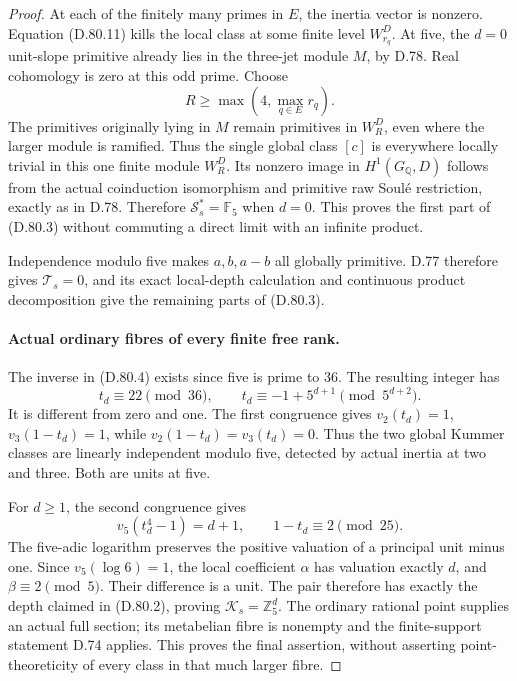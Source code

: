 \begin{proof}
At each of the finitely many primes in \(E\), the inertia
vector is nonzero. Equation (D.80.11) kills the local
class at some finite level \(W_{r_q}^D\). At five,
the \(d=0\) unit-slope primitive already lies in the
three-jet module \(M\), by D.78. Real cohomology is
zero at this odd prime. Choose
\[
                         R\ge\max(4,\max_{q\in E}r_q).
                                                               \tag{D.80.15}
\]
The primitives originally lying in \(M\) remain primitives
in \(W_R^D\), even where the larger module is ramified.
Thus the single global class \([c]\) is everywhere locally
trivial in this one finite module \(W_R^D\). Its nonzero
image in \(H^1(G_{\mathbb Q},D)\) follows from the actual
coinduction isomorphism and primitive raw Soul\'e restriction,
exactly as in D.78. Therefore \(\mathcal S_s^*=\mathbb F_5\)
when \(d=0\). This proves the first part of (D.80.3)
without commuting a direct limit with an infinite product.

Independence modulo five makes \(a,b,a-b\) all globally
primitive. D.77 therefore gives \(\mathcal T_s=0\), and
its exact local-depth calculation and continuous product
decomposition give the remaining parts of (D.80.3).

\paragraph{Actual ordinary fibres of every finite free rank.}
The inverse in (D.80.4) exists since five is prime to \(36\).
The resulting integer has
\[
 t_d\equiv22\pmod{36},\qquad
 t_d\equiv-1+5^{d+1}\pmod{5^{d+2}}.                    \tag{D.80.16}
\]
It is different from zero and one. The first congruence
gives \(v_2(t_d)=1\), \(v_3(1-t_d)=1\), while
\(v_2(1-t_d)=v_3(t_d)=0\). Thus the two global Kummer
classes are linearly independent modulo five, detected
by actual inertia at two and three. Both are units at five.

For \(d\ge1\), the second congruence gives
\[
 v_5(t_d^4-1)=d+1,\qquad 1-t_d\equiv2\pmod{25}.
\]
The five-adic logarithm preserves the positive valuation
of a principal unit minus one. Since \(v_5(\log6)=1\),
the local coefficient \(\alpha\) has valuation exactly
\(d\), and \(\beta\equiv2\pmod5\). Their difference
is a unit. The pair therefore has exactly the depth
claimed in (D.80.2), proving \(\mathcal K_s=\mathbb Z_5^d\).
The ordinary rational point supplies an actual full
section; its metabelian fibre is nonempty and the
finite-support statement D.74 applies. This proves
the final assertion, without asserting point-theoreticity
of every class in that much larger fibre.
\end{proof}
